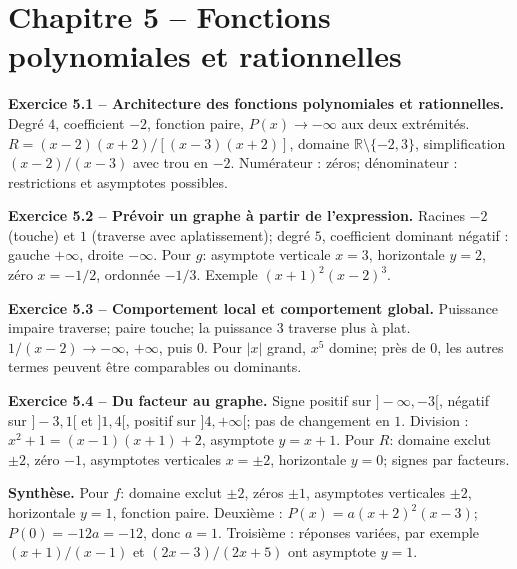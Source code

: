 \documentclass[11pt,a4paper,openany]{book}
\newcommand{\R}{\mathbb{R}}\newcommand{\N}{\mathbb{N}}\newcommand{\Z}{\mathbb{Z}}\newcommand{\Q}{\mathbb{Q}}
\begin{document}
\chapter*{Chapitre 5 -- Fonctions polynomiales et rationnelles}
\begin{answerbox}
\textbf{Exercice 5.1 -- Architecture des fonctions polynomiales et rationnelles.} Degré $4$, coefficient $-2$, fonction paire, $P(x)\to-\infty$ aux deux extrémités. $R=(x-2)(x+2)/[(x-3)(x+2)]$, domaine $\R\setminus\{-2,3\}$, simplification $(x-2)/(x-3)$ avec trou en $-2$. Numérateur : zéros; dénominateur : restrictions et asymptotes possibles.\par
\textbf{Exercice 5.2 -- Prévoir un graphe à partir de l'expression.} Racines $-2$ (touche) et $1$ (traverse avec aplatissement); degré $5$, coefficient dominant négatif : gauche $+\infty$, droite $-\infty$. Pour $g$: asymptote verticale $x=3$, horizontale $y=2$, zéro $x=-1/2$, ordonnée $-1/3$. Exemple $(x+1)^2(x-2)^3$.\par
\textbf{Exercice 5.3 -- Comportement local et comportement global.} Puissance impaire traverse; paire touche; la puissance $3$ traverse plus à plat. $1/(x-2)\to-\infty$, $+\infty$, puis $0$. Pour $|x|$ grand, $x^5$ domine; près de $0$, les autres termes peuvent être comparables ou dominants.\par
\textbf{Exercice 5.4 -- Du facteur au graphe.} Signe positif sur $]-\infty,-3[$, négatif sur $]-3,1[$ et $]1,4[$, positif sur $]4,+\infty[$; pas de changement en $1$. Division : $x^2+1=(x-1)(x+1)+2$, asymptote $y=x+1$. Pour $R$: domaine exclut $\pm2$, zéro $-1$, asymptotes verticales $x=\pm2$, horizontale $y=0$; signes par facteurs.\par
\medskip\textbf{Synthèse.} Pour $f$: domaine exclut $\pm2$, zéros $\pm1$, asymptotes verticales $\pm2$, horizontale $y=1$, fonction paire. Deuxième : $P(x)=a(x+2)^2(x-3)$; $P(0)=-12a=-12$, donc $a=1$. Troisième : réponses variées, par exemple $(x+1)/(x-1)$ et $(2x-3)/(2x+5)$ ont asymptote $y=1$.
\end{answerbox}
\end{document}
